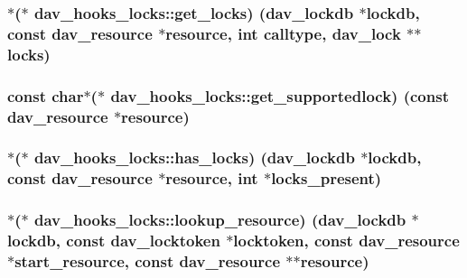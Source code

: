 \subsubsection[{\texorpdfstring{get\+\_\+locks}{get_locks}}]{$\ast$($\ast$ dav\+\_\+hooks\+\_\+locks\+::get\+\_\+locks) ({\bf dav\+\_\+lockdb} $\ast${\bf lockdb}, const {\bf dav\+\_\+resource} $\ast${\bf resource}, {\bf int} calltype, {\bf dav\+\_\+lock} $\ast$$\ast${\bf locks})}\hypertarget{structdav__hooks__locks_a46239c6e669cd43025d41afd3d7f89b1}{}\label{structdav__hooks__locks_a46239c6e669cd43025d41afd3d7f89b1}
\subsubsection[{\texorpdfstring{get\+\_\+supportedlock}{get_supportedlock}}]{\setlength{\rightskip}{0pt plus 5cm}const char$\ast$($\ast$ dav\+\_\+hooks\+\_\+locks\+::get\+\_\+supportedlock) (const {\bf dav\+\_\+resource} $\ast${\bf resource})}\hypertarget{structdav__hooks__locks_a639d454c7452c56a2131cefd96ea602f}{}\label{structdav__hooks__locks_a639d454c7452c56a2131cefd96ea602f}
\subsubsection[{\texorpdfstring{has\+\_\+locks}{has_locks}}]{$\ast$($\ast$ dav\+\_\+hooks\+\_\+locks\+::has\+\_\+locks) ({\bf dav\+\_\+lockdb} $\ast${\bf lockdb}, const {\bf dav\+\_\+resource} $\ast${\bf resource}, {\bf int} $\ast$locks\+\_\+present)}\hypertarget{structdav__hooks__locks_aff34306a6307f46c0394ea65170acd1b}{}\label{structdav__hooks__locks_aff34306a6307f46c0394ea65170acd1b}
\subsubsection[{\texorpdfstring{lookup\+\_\+resource}{lookup_resource}}]{$\ast$($\ast$ dav\+\_\+hooks\+\_\+locks\+::lookup\+\_\+resource) ({\bf dav\+\_\+lockdb} $\ast${\bf lockdb}, const {\bf dav\+\_\+locktoken} $\ast${\bf locktoken}, const {\bf dav\+\_\+resource} $\ast$start\+\_\+resource, const {\bf dav\+\_\+resource} $\ast$$\ast${\bf resource})}\hypertarget{structdav__hooks__locks_aee30059f43dec7c4e1b59c9c33a122b5}{}\label{structdav__hooks__locks_aee30059f43dec7c4e1b59c9c33a122b5}
